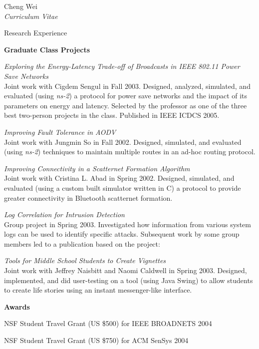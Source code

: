 \documentclass[10pt]{article}
\newenvironment{subbulletlist}{%
	\begin{list}{\labelitemii}{%
		\setlength{\topsep}{\itemsep}\setlength{\parskip}{\parsep}%
	}%
}%
{ \end{list} }
\begin{document}
\begin{cv}{Cheng Wei\\{\large \itshape Curriculum Vitae}}
\begin{cvlist}{Research Experience}
	\item \textbf{Graduate Class Projects}
	\begin{subbulletlist}
		\item \textit{Exploring the Energy-Latency Trade-off of Broadcasts
		in IEEE 802.11 Power Save Networks}\\
		Joint work with Cigdem Sengul in Fall 2003.  
		Designed, analyzed, simulated, and evaluated (using \textit{ns-2}) 
		a protocol for power save networks and the 
		impact of its parameters on energy and latency.  Selected by the
		professor as one of the three best two-person projects in the
		class.  Published in IEEE ICDCS 2005.
		\item \textit{Improving Fault Tolerance in AODV}\\
		Joint work with Jungmin So in Fall 2002.  Designed, simulated,
		and evaluated (using \textit{ns-2})
		techniques to maintain multiple routes in an ad-hoc routing protocol.
		\item \textit{Improving Connectivity in a Scatternet Formation
		Algorithm}\\
		Joint work with Cristina L. Abad in Spring 2002.  Designed,
		simulated, and evaluated (using a custom built simulator written
		in C) a protocol to provide greater
		connectivity in Bluetooth scatternet formation. 
		\item \textit{Log Correlation for Intrusion Detection}\\
		Group project in Spring 2003.  Investigated how information 
		from various system
		logs can be used to identify specific attacks.  Subsequent work 
		by some group members led to a publication based on the
		project:  
		\renewcommand*{\biblabelsep}{1.5em}
		\item \textit{Tools for Middle School Students to Create Vignettes}\\
		Joint work with Jeffrey Naisbitt and Naomi Caldwell in Spring
		2003.  Designed, implemented, and did user-testing on a
		tool (using Java Swing) to allow students to create life 
		stories using an instant messenger-like interface.
	\end{subbulletlist}
	\item \textbf{Awards}
	\begin{subbulletlist}
		\item NSF Student Travel Grant (US \$500) for IEEE BROADNETS 2004 
		\item NSF Student Travel Grant (US \$750) for ACM SenSys 2004

\end{subbulletlist}
\end{cvlist}
\end{cv}
\end{document}
